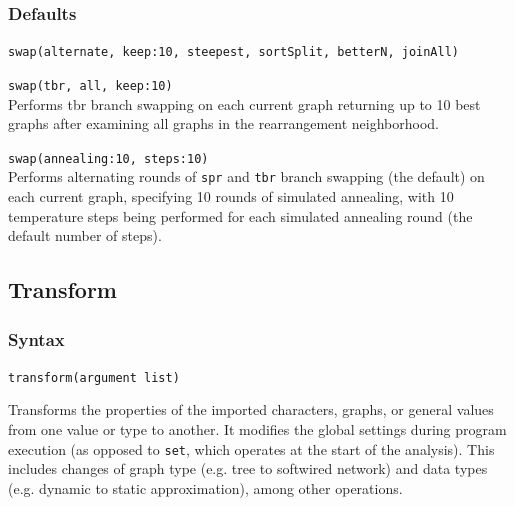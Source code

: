 		\subsubsection{Defaults}
			\texttt{swap(alternate, keep:10, steepest, sortSplit, betterN, joinAll)}
		
		\begin{example}
		
			\item{\texttt{swap(tbr, all, keep:10)}\\Performs tbr branch swapping on each current graph 
			returning up to 10 best graphs after examining all graphs in 
			the rearrangement neighborhood.}
			
			\item{\texttt{swap(annealing:10, steps:10)}\\Performs alternating rounds of \texttt{spr} and 
			\texttt{tbr} branch swapping (the default) on each current graph, specifying 10 rounds of
			simulated annealing, with 10 temperature steps being performed for each
			simulated annealing round (the default number of steps).}
			
		\end{example}
	
\subsection{Transform}
\label{subsec:transform}
	\subsubsection{Syntax}
		\texttt{transform(argument list)}
			
	\begin{phygdescription}
		{Transforms the properties of the imported characters, graphs, or general values 
		from one value or type to another. It modifies the global settings during program 
		execution (as opposed to \texttt{set}, which operates at the start of the analysis). 
		This includes changes of graph type (e.g. tree to softwired network) and data types 
		(e.g. dynamic to static approximation), among other operations.}
	\end{phygdescription}
			
